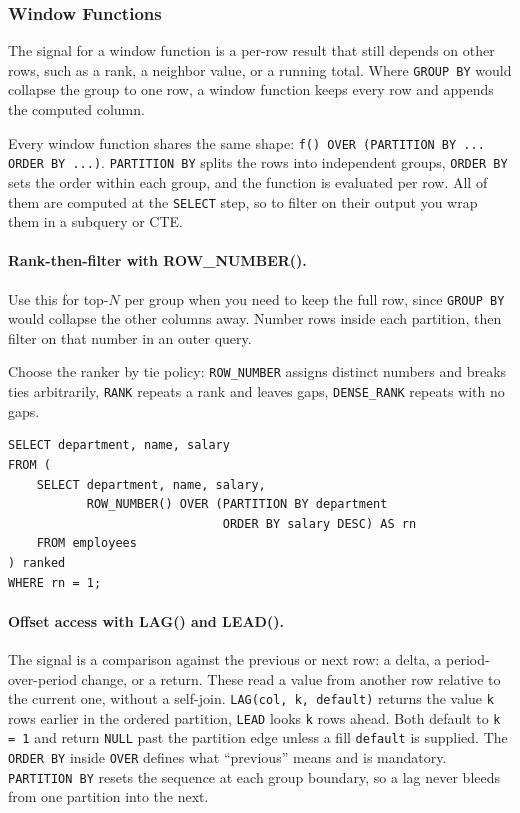 \subsubsection{Window Functions}

The signal for a window function is a per-row result that still depends on
other rows, such as a rank, a neighbor value, or a running total. Where
\texttt{GROUP BY} would collapse the group to one row, a window function keeps
every row and appends the computed column.

Every window function shares the same shape:
\texttt{f() OVER (PARTITION BY ... ORDER BY ...)}. \texttt{PARTITION BY} splits
the rows into independent groups, \texttt{ORDER BY} sets the order within each
group, and the function is evaluated per row. All of them are computed at the
\texttt{SELECT} step, so to filter on their output you wrap them in a subquery
or CTE.

\paragraph{Rank-then-filter with ROW\_NUMBER().} Use this for top-$N$ per
group when you need to keep the full row, since \texttt{GROUP BY} would collapse
the other columns away. Number rows inside each partition, then filter on that
number in an outer query.

Choose the ranker by tie policy: \texttt{ROW\_NUMBER} assigns distinct numbers
and breaks ties arbitrarily, \texttt{RANK} repeats a rank and leaves gaps,
\texttt{DENSE\_RANK} repeats with no gaps.

\begin{lstlisting}[style=sql, caption={Highest-paid employee per department}]
SELECT department, name, salary
FROM (
    SELECT department, name, salary,
           ROW_NUMBER() OVER (PARTITION BY department
                              ORDER BY salary DESC) AS rn
    FROM employees
) ranked
WHERE rn = 1;
\end{lstlisting}

\vspace{-4ex}

\paragraph{Offset access with LAG() and LEAD().} The signal is a comparison
against the previous or next row: a delta, a period-over-period change, or a
return. These read a value from another row relative to the current one,
without a self-join. \texttt{LAG(col, k, default)} returns the value \texttt{k}
rows earlier in the ordered partition, \texttt{LEAD} looks \texttt{k} rows
ahead. Both default to \texttt{k = 1} and return \texttt{NULL} past the
partition edge unless a fill \texttt{default} is supplied. The \texttt{ORDER BY}
inside \texttt{OVER} defines what ``previous'' means and is mandatory.
\texttt{PARTITION BY} resets the sequence at each group boundary, so a lag never
bleeds from one partition into the next.

